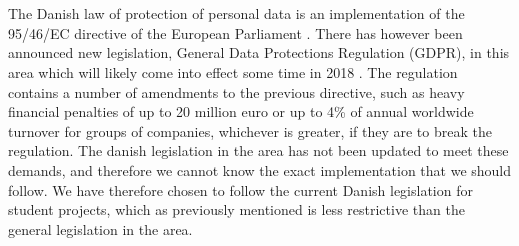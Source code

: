 \\\\
The Danish law of protection of personal data is an implementation of the 95/46/EC directive of the European Parliament \parencite{eu_personal_data_law}. There has however been announced new legislation, General Data Protections Regulation (GDPR), in this area which will likely come into effect some time in 2018 \parencite{eu_data_law_changing}. The regulation contains a number of amendments to the previous directive, such as heavy financial penalties of up to 20 million euro or up to 4\% of annual worldwide turnover for groups of companies, whichever is greater, if they are to break the regulation. The danish legislation in the area has not been updated to meet these demands, and therefore we cannot know the exact implementation that we should follow. We have therefore chosen to follow the current Danish legislation for student projects, which as previously mentioned is less restrictive than the general legislation in the area. 
